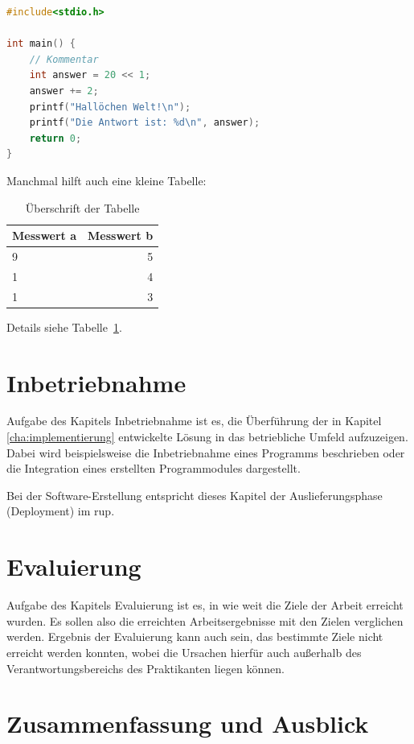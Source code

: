 \documentclass[oneside]{ausarbeitung}
\begin{document}
\begin{lstlisting}[language=c,%
                   caption={Überschrift des Quelltexts},label=lst:test]
#include<stdio.h>

int main() {
    // Kommentar
    int answer = 20 << 1;
    answer += 2;
    printf("Hallöchen Welt!\n");
    printf("Die Antwort ist: %d\n", answer);
    return 0;
}
\end{lstlisting}

Manchmal hilft auch eine kleine Tabelle:

\begin{table}[htbp]
\centering
\begin{tabular}{|l|r|}
\hline
\textbf{Messwert a} & \textbf{Messwert b} \\ \hline
9 & 5 \\ \hline
1 & 4 \\ \hline
1 & 3 \\ \hline
\end{tabular}
\caption{Überschrift der Tabelle}
\label{tab:my-table}
\end{table}

Details siehe Tabelle~\ref{tab:my-table}.
\chapter{Inbetriebnahme}
\label{cha:inbetriebnahme}

Aufgabe des Kapitels Inbetriebnahme ist es, die Überführung der in
Kapitel \ref{cha:implementierung} entwickelte Lösung in das betriebliche
Umfeld aufzuzeigen. Dabei wird beispielsweise die Inbetriebnahme eines
Programms beschrieben oder die Integration eines erstellten
Programmodules dargestellt.

Bei der Software-Erstellung entspricht dieses Kapitel der
Auslieferungsphase (Deployment) im \ac{rup}.

\chapter{Evaluierung}

Aufgabe des Kapitels Evaluierung ist es, in wie weit die Ziele der
Arbeit erreicht wurden. Es sollen also die erreichten Arbeitsergebnisse
mit den Zielen verglichen werden. Ergebnis der Evaluierung kann auch
sein, das bestimmte Ziele nicht erreicht werden konnten, wobei die
Ursachen hierfür auch außerhalb des Verantwortungsbereichs des
Praktikanten liegen können.

\chapter{Zusammenfassung und Ausblick}
\label{cha:zusammenfassung}
\end{document}
